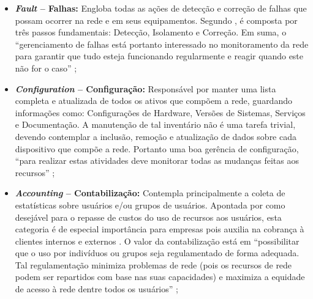 \documentclass[twoside,english,brazilian]{UNISINOSmonografia}
\begin{document}
	\begin{itemize}
		\item \textbf{\textit{Fault} -- Falhas:} 
Engloba todas as ações de detecção e correção de falhas que possam ocorrer na 
rede e em seus equipamentos. 
Segundo , é composta por três passos fundamentais: 
Detecção, Isolamento e Correção. 
Em suma, o ``gerenciamento de falhas está portanto interessado no 
monitoramento da rede para garantir que tudo esteja funcionando regularmente e 
reagir quando este não for o caso'' \cite{Clemm2006};

		\item \textbf{\textit{Configuration} -- Configuração:}
Responsável por manter uma lista completa e atualizada de todos os ativos que 
compõem a rede, guardando informações como: Configurações de Hardware, Versões 
de Sistemas, Serviços e Documentação.
\cite{Clemm2006,Ding2009,Mauro2009}
A manutenção de tal inventário não é uma tarefa trivial, devendo contemplar a 
inclusão, remoção e atualização de dados sobre cada dispositivo que compõe a 
rede. 
Portanto uma boa gerência de configuração, ``para realizar estas 
atividades deve monitorar todas as mudanças feitas aos recursos'' 
\cite{Wang2012};


		\item \textbf{\textit{Accounting} -- Contabilização:}
Contempla principalmente a coleta de estatísticas sobre usuários e/ou grupos 
de usuários. 
Apontada por  como desejável para o repasse 
de custos do uso de recursos aos usuários, esta categoria é de especial 
importância para empresas pois auxilia na cobrança à clientes internos e 
externos \cite{Clemm2006}. 
O valor da contabilização está em ``possibilitar que o uso por indivíduos ou 
grupos seja regulamentado de forma adequada. Tal regulamentação minimiza 
problemas de rede (pois os recursos de rede podem ser repartidos com base nas 
suas capacidades) e maximiza a equidade de acesso à rede dentre todos os 
usuários'' \cite{Ding2009};



\end{itemize}
\end{document}
